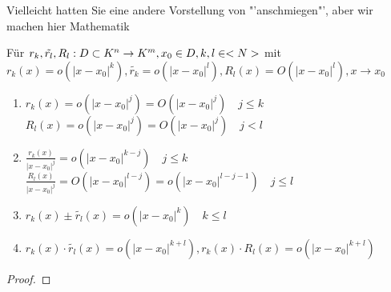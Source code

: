 \smiley{} Vielleicht hatten Sie eine andere Vorstellung von "'anschmiegen"', aber wir machen hier 
Mathematik \smiley{}

\begin{proposition}
	Für $r_k,\tilde{r_l},R_l:D\subset K^n\to K^m,x_0\in D,k,l\in<N>$ mit \\
	$r_k(x)=o(\vert x-x_0\vert^k),\tilde{r_k}=o(\vert x-x_0\vert^l),R_l(x)=O(\vert x-x_0\vert ^l),x\to x_0$
	\begin{enumerate}[label={\alph*)}]
		\item $r_k(x)=o(\vert x-x_0\vert^j)=O(\vert x-x_0\vert^j)\quad j\le k$ \\
		$R_l(x)=o(\vert x-x_0\vert^j)=O(\vert x-x_0\vert^j)\quad j<l$
		\item $\frac{r_k(x)}{\vert x-x_0\vert^j}=o(\vert x-x_0\vert^{k-j})\quad j\le k$ \\
		$\frac{R_l(x)}{\vert x-x_0\vert^j}=O(\vert x-x_0\vert^{l-j})=o(\vert x-x_0\vert^{l-j-1})\quad j\le l$
		\item $r_k(x)\pm \tilde{r_l}(x)=o(\vert x-x_0\vert ^k)\quad k\le l$
		\item $r_k(x)\cdot \tilde{r_l}(x)=o(\vert x-x_0\vert^{k+l}),r_k(x)\cdot R_l(x)=o(\vert x-x_0\vert^{k+l})$
	\end{enumerate}
\end{proposition}
\begin{proof}
	
\end{proof}
